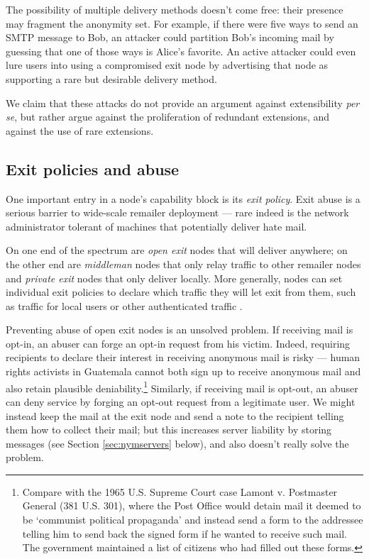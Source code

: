 \documentclass{llncs}
\begin{document}
The possibility of multiple delivery methods doesn't come free: their
presence may fragment the anonymity set.  For example, if there were five
ways to send an SMTP message to Bob, an attacker could partition Bob's
incoming mail by guessing that one of those ways is Alice's favorite.
An active attacker could even lure users into using a compromised
exit node by advertising that node as supporting a
rare but desirable delivery method.

We claim that these attacks do not provide an argument against
extensibility \emph{per se}, but rather argue against the proliferation
of redundant extensions, and against the use of rare extensions.  

\subsection{Exit policies and abuse}
\label{subsec:exitpolicies}

One important entry in a node's capability block is its \emph{exit
policy}. Exit abuse is a serious barrier to wide-scale remailer deployment
--- rare indeed is the network administrator tolerant of machines that
potentially deliver hate mail. %

On one end of the spectrum are \emph{open exit} nodes that will
deliver anywhere; on the other end are \emph{middleman} nodes that
only relay traffic to other remailer nodes and \emph{private exit}
nodes that only deliver locally. More generally, nodes can set
individual exit policies to declare which traffic they will let exit
from them, such as traffic for local users or other authenticated
traffic \cite{onion-discex00}.

Preventing abuse of open exit nodes is an unsolved problem. If
receiving mail is opt-in, an abuser can forge an opt-in request from
his victim. Indeed, requiring recipients to declare their interest
in receiving anonymous mail is risky --- human rights activists in
Guatemala cannot both sign up to receive anonymous mail and also retain
plausible deniability.\footnote{
  Compare with the 1965 U.S. Supreme Court case Lamont v. Postmaster
  General (381 U.S. 301), where the Post Office would detain mail it
  deemed to be `communist political propaganda' and instead send a form
  to the addressee telling him to send back the signed form if he wanted
  to receive such mail. The government maintained a list of citizens
  who had filled out these forms.
} Similarly, if receiving mail is opt-out, an abuser can deny service
by forging an opt-out request from a legitimate user. We might instead
keep the mail at the exit node and send a note to the recipient
telling them how to collect their mail; but this increases
server liability by storing messages (see Section \ref{sec:nymservers}
below), and also doesn't really solve the problem.
\end{document}
